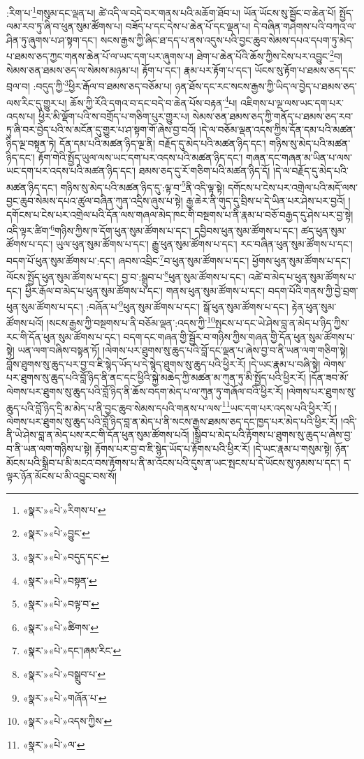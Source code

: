 :རིག་པ་\footnote{«སྣར་»«པེ་»རིགས་པ་}གསུམ་དང་ལྡན་པ། ཚེ་འདི་ལ་བདེ་བར་གནས་པའི་མཆོག་ཐོབ་པ། ཡོན་ཡོངས་སུ་སྦྱོང་བ་ཆེན་པོ། སྤྱོད་ལམ་རབ་ཏུ་ཞི་བ་ཕུན་སུམ་ཚོགས་པ། བཟོད་པ་དང་དེས་པ་ཆེན་པོ་དང་ལྡན་པ། དེ་བཞིན་གཤེགས་པའི་བཀའ་ལ་ཤིན་ཏུ་ཞུགས་པ་ཤ་སྟག་དང་། སངས་རྒྱས་ཀྱི་ཞིང་ཐ་དད་པ་ནས་འདུས་པའི་བྱང་ཆུབ་སེམས་དཔའ་དཔག་ཏུ་མེད་པ་ཐམས་ཅད་ཀྱང་གནས་ཆེན་པོ་ལ་ཡང་དག་པར་ཞུགས་པ། ཐེག་པ་ཆེན་པོའི་ཆོས་ཀྱིས་ངེས་པར་འབྱུང་\footnote{«སྣར་»«པེ་»བྱུང་}བ། སེམས་ཅན་ཐམས་ཅད་ལ་སེམས་མཉམ་པ། རྟོག་པ་དང་། རྣམ་པར་རྟོག་པ་དང་། ཡོངས་སུ་རྟོག་པ་ཐམས་ཅད་དང་བྲལ་བ། :བདུད་ཀྱི་\footnote{«སྣར་»«པེ་»བདུད་དང་}ཕྱིར་རྒོལ་བ་ཐམས་ཅད་བཅོམ་པ། ཉན་ཐོས་དང་རང་སངས་རྒྱས་ཀྱི་ཡིད་ལ་བྱེད་པ་ཐམས་ཅད་ལས་རིང་དུ་གྱུར་པ། ཆོས་ཀྱི་རོའི་དགའ་བ་དང་བདེ་བ་ཆེན་པོས་བརྟན་\footnote{«སྣར་»«པེ་»བསྟན་}པ། འཇིགས་པ་ལྔ་ལས་ཡང་དག་པར་འདས་པ། ཕྱིར་མི་ལྡོག་པའི་ས་བགྲོད་པ་གཅིག་པུར་གྱུར་པ། སེམས་ཅན་ཐམས་ཅད་ཀྱི་གནོད་པ་ཐམས་ཅད་རབ་ཏུ་ཞི་བར་བྱེད་པའི་ས་མངོན་དུ་གྱུར་པ་ཤ་སྟག་གོ་ཞེས་བྱ་བའོ། །དེ་ལ་བཅོམ་ལྡན་འདས་ཀྱིས་དོན་དམ་པའི་མཚན་ཉིད་ལྔ་བསྟན་ཏེ། དོན་དམ་པའི་མཚན་ཉིད་ལྔ་ནི། བརྗོད་དུ་མེད་པའི་མཚན་ཉིད་དང་། གཉིས་སུ་མེད་པའི་མཚན་ཉིད་དང་། རྟོག་གེའི་སྤྱོད་ཡུལ་ལས་ཡང་དག་པར་འདས་པའི་མཚན་ཉིད་དང་། གཞན་དང་གཞན་མ་ཡིན་པ་ལས་ཡང་དག་པར་འདས་པའི་མཚན་ཉིད་དང་། ཐམས་ཅད་དུ་རོ་གཅིག་པའི་མཚན་ཉིད་དོ། །དེ་ལ་བརྗོད་དུ་མེད་པའི་མཚན་ཉིད་དང་། གཉིས་སུ་མེད་པའི་མཚན་ཉིད་དུ་:ལྟ་བ་\footnote{«སྣར་»«པེ་»བལྟ་བ་}ནི་འདི་ལྟ་སྟེ། དགོངས་པ་ངེས་པར་འགྲེལ་པའི་མདོ་ལས་བྱང་ཆུབ་སེམས་དཔའ་ཚུལ་བཞིན་ཀུན་འདྲིས་ཞུས་པ་སྟེ། རྒྱ་ཆེར་ནི་གུད་དུ་བྲིས་པ་དེ་ཡིན་པར་ཤེས་པར་བྱའོ། །དགོངས་པ་ངེས་པར་འགྲེལ་པའི་དོན་ལས་གཞལ་མེད་ཁང་གི་བསྔགས་པ་ནི་རྣམ་པ་བཅོ་བརྒྱད་དུ་ཤེས་པར་བྱ་སྟེ། འདི་ལྟར་ཚིག་\footnote{«སྣར་»«པེ་»ཚིགས་}གཉིས་ཀྱིས་ཁ་དོག་ཕུན་སུམ་ཚོགས་པ་དང་། དབྱིབས་ཕུན་སུམ་ཚོགས་པ་དང་། ཚད་ཕུན་སུམ་ཚོགས་པ་དང་། ཡུལ་ཕུན་སུམ་ཚོགས་པ་དང་། རྒྱུ་ཕུན་སུམ་ཚོགས་པ་དང་། རང་བཞིན་ཕུན་སུམ་ཚོགས་པ་དང་། བདག་པོ་ཕུན་སུམ་ཚོགས་པ་:དང་། ཞབས་འབྲིང་\footnote{«སྣར་»«པེ་»དང་།ཞམ་རིང་}བ་ཕུན་སུམ་ཚོགས་པ་དང་། ཕྱོགས་ཕུན་སུམ་ཚོགས་པ་དང་། ལོངས་སྤྱོད་ཕུན་སུམ་ཚོགས་པ་དང་། བྱ་བ་:སྒྲུབ་པ་\footnote{«སྣར་»«པེ་»བསྒྲུབ་པ་}ཕུན་སུམ་ཚོགས་པ་དང་། འཚེ་བ་མེད་པ་ཕུན་སུམ་ཚོགས་པ་དང་། ཕྱིར་རྒོལ་བ་མེད་པ་ཕུན་སུམ་ཚོགས་པ་དང་། གནས་ཕུན་སུམ་ཚོགས་པ་དང་། བདག་པོའི་གནས་ཀྱི་བྱེ་བྲག་ཕུན་སུམ་ཚོགས་པ་དང་། :བཞོན་པ་\footnote{«སྣར་»«པེ་»གཞོན་པ་}ཕུན་སུམ་ཚོགས་པ་དང་། སྒོ་ཕུན་སུམ་ཚོགས་པ་དང་། རྟེན་ཕུན་སུམ་ཚོགས་པའོ། །སངས་རྒྱས་ཀྱི་བསྔགས་པ་ནི་བཅོམ་ལྡན་:འདས་ཀྱི་\footnote{«སྣར་»«པེ་»འདས་ཀྱིས་}སྤངས་པ་དང་ཡེ་ཤེས་བླ་ན་མེད་པ་ཉིད་ཀྱིས་རང་གི་དོན་ཕུན་སུམ་ཚོགས་པ་དང་། བདག་དང་གཞན་གྱི་སྦྱོར་བ་གཉིས་ཀྱིས་གཞན་གྱི་དོན་ཕུན་སུམ་ཚོགས་པ་སྟེ། ཡན་ལག་བཞིས་བསྟན་ཏོ། །ལེགས་པར་ཐུགས་སུ་ཆུད་པའི་བློ་དང་ལྡན་པ་ཞེས་བྱ་བ་ནི་ཡན་ལག་གཅིག་སྟེ། བློས་ཐུགས་སུ་ཆུད་པར་བྱ་བ་ཇི་སྙེད་ཡོད་པ་དེ་སྙེད་ཐུགས་སུ་ཆུད་པའི་ཕྱིར་རོ། །དེ་ཡང་རྣམ་པ་བཞི་སྟེ། ལེགས་པར་ཐུགས་སུ་ཆུད་པའི་བློ་ཉིད་ནི་ནང་དང་ཕྱིའི་སྐྱེ་མཆེད་ཀྱི་མཚན་མ་ཀུན་ཏུ་མི་སྤྱོད་པའི་ཕྱིར་རོ། །དོན་ཟབ་མོ་ལེགས་པར་ཐུགས་སུ་ཆུད་པའི་བློ་ཉིད་ནི་ཆོས་བདག་མེད་པ་ལ་ཀུན་ཏུ་གཞོལ་བའི་ཕྱིར་རོ། །ལེགས་པར་ཐུགས་སུ་ཆུད་པའི་བློ་ཉིད་དྲི་མ་མེད་པ་ནི་བྱང་ཆུབ་སེམས་དཔའི་གནས་པ་ལས་\footnote{«སྣར་»«པེ་»ལ་}ཡང་དག་པར་འདས་པའི་ཕྱིར་རོ། །ལེགས་པར་ཐུགས་སུ་ཆུད་པའི་བློ་ཉིད་བླ་ན་མེད་པ་ནི་སངས་རྒྱས་ཐམས་ཅད་དང་ཁྱད་པར་མེད་པའི་ཕྱིར་རོ། །འདི་ནི་ཡེ་ཤེས་བླ་ན་མེད་པས་རང་གི་དོན་ཕུན་སུམ་ཚོགས་པའོ། །སྒྲིབ་པ་མེད་པའི་རྟོགས་པ་ཐུགས་སུ་ཆུད་པ་ཞེས་བྱ་བ་ནི་ཡན་ལག་གཉིས་པ་སྟེ། རྟོགས་པར་བྱ་བ་ཇི་སྙེད་ཡོད་པ་རྟོགས་པའི་ཕྱིར་རོ། །དེ་ཡང་རྣམ་པ་གསུམ་སྟེ། ཉོན་མོངས་པའི་སྒྲིབ་པ་མི་མངའ་བས་རྟོགས་པ་ནི་མ་འོངས་པའི་དུས་ན་ཡང་སྤངས་པ་དེ་ཡོངས་སུ་ཉམས་པ་དང་། ད་ལྟར་ཉོན་མོངས་པ་མི་འབྱུང་བས་སོ། 